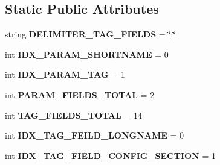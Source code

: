 \subsection*{Static Public Attributes}
\begin{DoxyCompactItemize}
\item 
string {\bfseries D\+E\+L\+I\+M\+I\+T\+E\+R\+\_\+\+T\+A\+G\+\_\+\+F\+I\+E\+L\+DS} = \char`\"{};\char`\"{}\hypertarget{classnegui_1_1pgparamset_1_1PGParamSet_a40e875db5bb216d88fee5fbce8bf229c}{}\label{classnegui_1_1pgparamset_1_1PGParamSet_a40e875db5bb216d88fee5fbce8bf229c}

\item 
int {\bfseries I\+D\+X\+\_\+\+P\+A\+R\+A\+M\+\_\+\+S\+H\+O\+R\+T\+N\+A\+ME} = 0\hypertarget{classnegui_1_1pgparamset_1_1PGParamSet_a5f0fb3e2685ab478b2cc610ddb3cb4ae}{}\label{classnegui_1_1pgparamset_1_1PGParamSet_a5f0fb3e2685ab478b2cc610ddb3cb4ae}

\item 
int {\bfseries I\+D\+X\+\_\+\+P\+A\+R\+A\+M\+\_\+\+T\+AG} = 1\hypertarget{classnegui_1_1pgparamset_1_1PGParamSet_aafe4650bfa58bd9751cdaa173b910c75}{}\label{classnegui_1_1pgparamset_1_1PGParamSet_aafe4650bfa58bd9751cdaa173b910c75}

\item 
int {\bfseries P\+A\+R\+A\+M\+\_\+\+F\+I\+E\+L\+D\+S\+\_\+\+T\+O\+T\+AL} = 2\hypertarget{classnegui_1_1pgparamset_1_1PGParamSet_aeaf803935c95ef6865aa8bc827290cde}{}\label{classnegui_1_1pgparamset_1_1PGParamSet_aeaf803935c95ef6865aa8bc827290cde}

\item 
int {\bfseries T\+A\+G\+\_\+\+F\+I\+E\+L\+D\+S\+\_\+\+T\+O\+T\+AL} = 14\hypertarget{classnegui_1_1pgparamset_1_1PGParamSet_a05678f5c1eb01e51e5f7e5f746eed310}{}\label{classnegui_1_1pgparamset_1_1PGParamSet_a05678f5c1eb01e51e5f7e5f746eed310}

\item 
int {\bfseries I\+D\+X\+\_\+\+T\+A\+G\+\_\+\+F\+E\+I\+L\+D\+\_\+\+L\+O\+N\+G\+N\+A\+ME} = 0\hypertarget{classnegui_1_1pgparamset_1_1PGParamSet_a8df35573197d7171fbb6c900b6dcb057}{}\label{classnegui_1_1pgparamset_1_1PGParamSet_a8df35573197d7171fbb6c900b6dcb057}

\item 
int {\bfseries I\+D\+X\+\_\+\+T\+A\+G\+\_\+\+F\+I\+E\+L\+D\+\_\+\+C\+O\+N\+F\+I\+G\+\_\+\+S\+E\+C\+T\+I\+ON} = 1\hypertarget{classnegui_1_1pgparamset_1_1PGParamSet_ac9ea8e939528fa5975acdfd6c0184d7b}{}\label{classnegui_1_1pgparamset_1_1PGParamSet_ac9ea8e939528fa5975acdfd6c0184d7b}


\end{DoxyCompactItemize}
